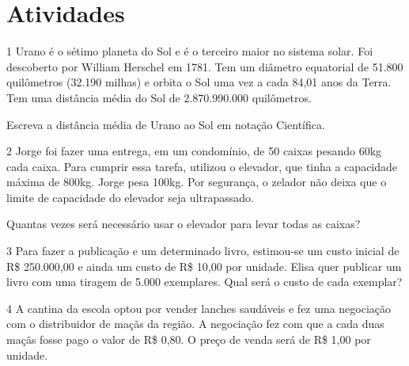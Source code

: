 \section{Atividades}

\num{1} Urano é o sétimo planeta do Sol e é o terceiro maior no sistema
solar. Foi descoberto por William Herschel em 1781. Tem um diâmetro
equatorial de 51.800 quilômetros (32.190 milhas) e orbita o Sol uma vez
a cada 84,01 anos da Terra. Tem uma distância média do Sol de
2.870.990.000 quilômetros.

Escreva a distância média de Urano ao Sol em notação Científica.

\begin{emptybox}
\end{emptybox}

\num{2} Jorge foi fazer uma entrega, em um condomínio, de 50 caixas
pesando 60kg cada caixa. Para cumprir essa tarefa, utilizou o elevador,
que tinha a capacidade máxima de 800kg. Jorge pesa 100kg. Por segurança,
o zelador não deixa que o limite de capacidade do elevador seja ultrapassado.

Quantas vezes será necessário usar o elevador para levar todas as
caixas?

\begin{emptybox}
\end{emptybox}

\num{3} Para fazer a publicação e um determinado livro, estimou-se um
custo inicial de R\$ 250.000,00 e ainda um custo de R\$ 10,00 por
unidade. Elisa quer publicar um livro com uma tiragem de 5.000
exemplares. Qual será o custo de cada exemplar?

\begin{emptybox}
\end{emptybox}

\num{4} A cantina da escola optou por vender lanches saudáveis e fez uma
negociação com o distribuidor de maçãs da região. A negociação fez com
que a cada duas maçãs fosse pago o valor de R\$ 0,80. O preço
de venda será de R\$ 1,00 por unidade.


